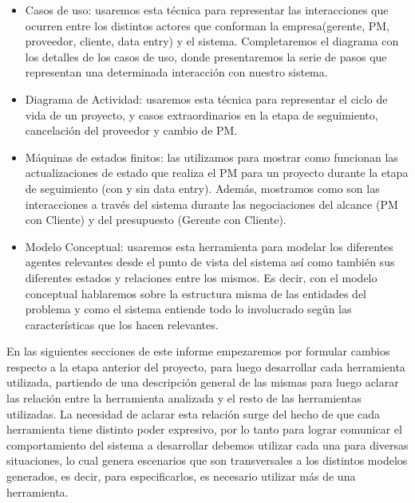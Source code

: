  \begin{itemize}
  \item Casos de uso: usaremos esta técnica para representar las interacciones que ocurren entre los distintos
  actores que conforman la empresa(gerente, PM, proveedor, cliente, data entry) y el sistema. Completaremos
  el diagrama con los detalles de los casos de uso, donde presentaremos la serie de pasos que representan una
  determinada interacción con nuestro sistema.
  \item Diagrama de Actividad: usaremos esta técnica para representar el ciclo de vida de un proyecto, y casos extraordinarios en la etapa de seguimiento, cancelación del proveedor y cambio de PM.
  \item Máquinas de estados finitos: las utilizamos para mostrar como funcionan las actualizaciones de estado que realiza el PM para un proyecto
  durante la etapa de seguimiento (con y sin data entry). Además, mostramos como son las interacciones a través del sistema durante las negociaciones
  del alcance (PM con Cliente) y del presupuesto (Gerente con Cliente).
  \item Modelo Conceptual: usaremos esta herramienta para modelar los diferentes agentes relevantes desde el punto de vista del sistema así como también sus diferentes estados y relaciones entre los mismos. Es decir, con el modelo conceptual hablaremos sobre la estructura misma de las entidades del problema y como el sistema entiende todo lo involucrado según las características que los hacen relevantes.
 \end{itemize}

En las siguientes secciones de este informe empezaremos por formular cambios respecto a la etapa anterior del proyecto, para luego desarrollar cada herramienta utilizada, partiendo de una descripción general de las mismas para luego aclarar las relación entre la herramienta analizada y el resto de las herramientas utilizadas. La necesidad de aclarar esta relación surge del hecho de que cada herramienta tiene distinto poder expresivo, por lo tanto
para lograr comunicar el comportamiento del sistema a desarrollar debemos utilizar cada una para diversas situaciones, lo cual genera escenarios que son transversales a los distintos modelos generados, es decir, para especificarlos, es necesario utilizar más de una herramienta.

